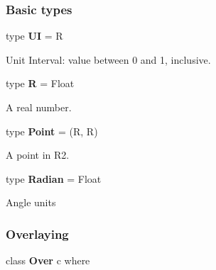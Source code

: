 

 

\subsubsection{Basic types}

 

{type {\bf UI} = R}

\hspace{0.05\textwidth}\begin{minipage}{0.9\textwidth}Unit Interval: value between 0 and 1, inclusive.\end{minipage}

 

{type {\bf R} = Float}

\hspace{0.05\textwidth}\begin{minipage}{0.9\textwidth}A real number.\end{minipage}

 

{type {\bf Point} = (R, R)}

\hspace{0.05\textwidth}\begin{minipage}{0.9\textwidth}A point in R2.\end{minipage}

 

{type {\bf Radian} = Float}

\hspace{0.05\textwidth}\begin{minipage}{0.9\textwidth}Angle units\end{minipage}

 

\subsubsection{Overlaying}

 

{class  {\bf Over} c  where}

